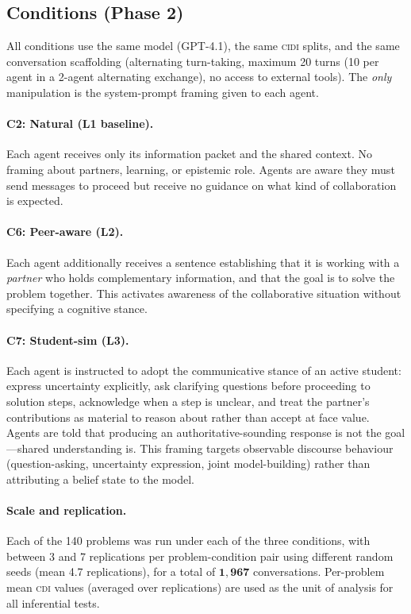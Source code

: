 \documentclass{article}
\newcommand{\CDI}{\textsc{cdi}}
\newcommand{\CIDI}{\textsc{cidi}}
\begin{document}
\subsection{Conditions (Phase 2)}

All conditions use the same model (GPT-4.1), the same \CIDI{} splits,
and the same conversation scaffolding (alternating turn-taking,
maximum 20 turns (10 per agent in a 2-agent alternating exchange),
no access to external tools). The \emph{only}
manipulation is the system-prompt framing given to each agent.

\paragraph{C2: Natural (L1 baseline).}
Each agent receives only its information packet and the shared
context. No framing about partners, learning, or epistemic role.
Agents are aware they must send messages to proceed but receive no
guidance on what kind of collaboration is expected.

\paragraph{C6: Peer-aware (L2).}
Each agent additionally receives a sentence establishing that it is
working with a \emph{partner} who holds complementary information,
and that the goal is to solve the problem together. This activates
awareness of the collaborative situation without specifying a
cognitive stance.

\paragraph{C7: Student-sim (L3).}
Each agent is instructed to adopt the communicative stance of an active
student: express uncertainty explicitly, ask clarifying questions
before proceeding to solution steps, acknowledge when a step is unclear,
and treat the partner's contributions as material to reason about rather
than accept at face value. Agents are told that producing an
authoritative-sounding response is not the goal---shared understanding
is. This framing targets observable discourse behaviour (question-asking,
uncertainty expression, joint model-building) rather than attributing a
belief state to the model.

\paragraph{Scale and replication.}
Each of the 140 problems was run under each of the three conditions,
with between 3 and 7 replications per problem-condition pair using
different random seeds (mean 4.7 replications), for a total of
$\mathbf{1{,}967}$ conversations. Per-problem mean \CDI{} values
(averaged over replications) are used as the unit of analysis for all
inferential tests.
\end{document}
